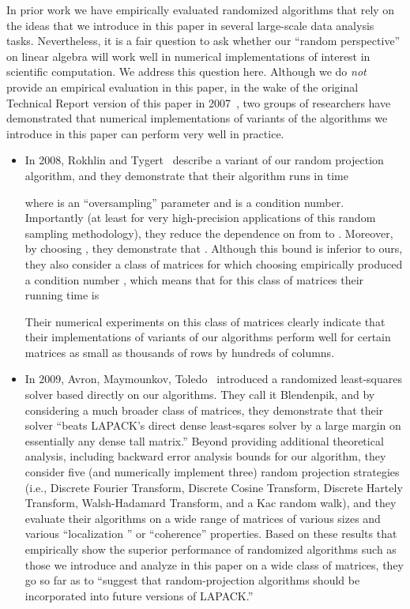 \documentclass[11pt]{article}
\begin{document}
In prior work we have empirically evaluated randomized algorithms that rely on
the ideas that we introduce in this paper in several large-scale data
analysis tasks. Nevertheless, it is a fair question to ask whether our ``random
perspective'' on linear algebra will work well in numerical
implementations of interest in scientific computation.
We address this question here.
Although we do \emph{not} provide an empirical evaluation in this paper,
in the wake of the original Technical Report version of this paper in
2007~\cite{DMMS07_FastL2_TR}, two groups of researchers have
demonstrated that numerical implementations of variants of the
algorithms we introduce in this paper can perform very well in practice.
\begin{itemize}
\item
In 2008, Rokhlin and Tygert~\cite{RT08} describe a variant of our random
projection algorithm, and they demonstrate that their algorithm runs in
time

where  is an ``oversampling'' parameter and  is a condition
number.
Importantly (at least for very high-precision applications of this random
sampling methodology), they reduce the dependence on  from
 to .
Moreover, by choosing , they demonstrate that .
Although this bound is inferior to ours, they also consider a class of
matrices for which choosing  empirically produced a condition
number , which means that for this class of matrices their
running time is

Their numerical experiments on this class of matrices clearly indicate that
their implementations of variants of our algorithms
perform well for certain matrices as small as thousands of rows by hundreds
of columns.
\item
In 2009, Avron, Maymounkov, Toledo~\cite{AMT09_DRAFT,AMT10}
introduced a randomized least-squares solver based directly on our
algorithms.
They call it Blendenpik, and by considering a much broader class of
matrices, they demonstrate that their solver ``beats \textsc{LAPACK}'s
direct dense least-sqares solver by a large margin on essentially any
dense tall matrix.''
Beyond providing additional theoretical analysis, including backward error
analysis bounds for our algorithm,
they consider five (and numerically implement three) random projection
strategies (i.e., Discrete Fourier Transform, Discrete Cosine
Transform, Discrete Hartely Transform, Walsh-Hadamard Transform, and a Kac
random walk), and they evaluate their algorithms on a wide range of matrices
of various sizes and various ``localization '' or ``coherence'' properties.
Based on these results that empirically show the superior performance of
randomized algorithms such as those we introduce and analyze in this paper
on a wide class of matrices, they go so far as to ``suggest that
random-projection algorithms should be incorporated into future versions of
\textsc{LAPACK}.''
\end{itemize}
\end{document}
